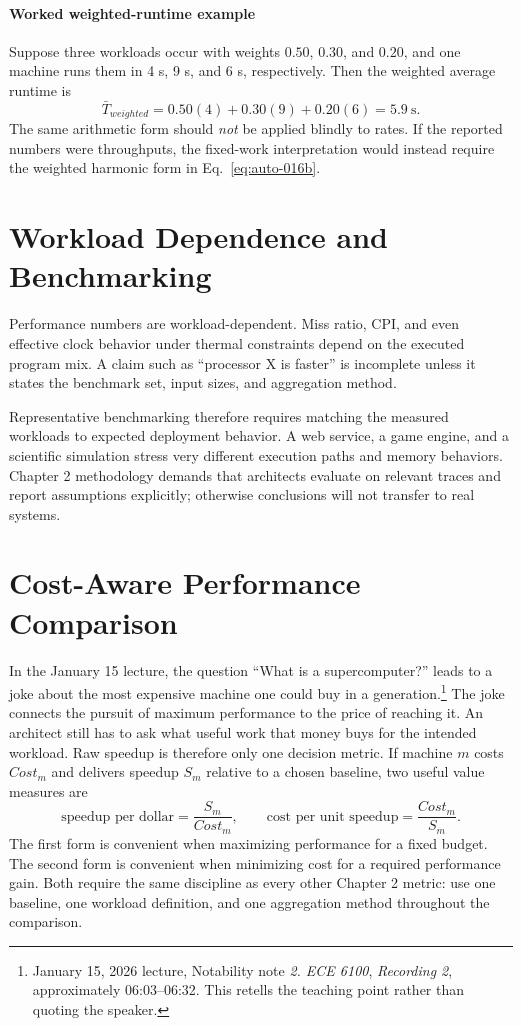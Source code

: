 \paragraph{Worked weighted-runtime example}\label{par:auto-011b}
Suppose three workloads occur with weights $0.50$, $0.30$, and $0.20$, and one machine runs them in 4 s, 9 s, and 6 s, respectively.
Then the weighted average runtime is
\begin{equation}\label{eq:auto-016c}
    \bar{T}_{weighted}=0.50(4)+0.30(9)+0.20(6)=5.9\ \text{s}.
\end{equation}
The same arithmetic form should \emph{not} be applied blindly to rates.
If the reported numbers were throughputs, the fixed-work interpretation would instead require the weighted harmonic form in Eq.~\eqref{eq:auto-016b}.


\section{Workload Dependence and Benchmarking}\label{sec:auto-017}
Performance numbers are workload-dependent.
Miss ratio, CPI, and even effective clock behavior under thermal constraints depend on the executed program mix.
A claim such as ``processor X is faster'' is incomplete unless it states the benchmark set, input sizes, and aggregation method.

Representative benchmarking therefore requires matching the measured workloads to expected deployment behavior.
A web service, a game engine, and a scientific simulation stress very different execution paths and memory behaviors.
Chapter 2 methodology demands that architects evaluate on relevant traces and report assumptions explicitly; otherwise conclusions will not transfer to real systems.


\section{Cost-Aware Performance Comparison}\label{sec:auto-017a}
In the January 15 lecture, the question ``What is a supercomputer?'' leads to a joke about the most expensive machine one could buy in a generation.\footnote{January 15, 2026 lecture, Notability note \emph{2. ECE 6100}, \emph{Recording 2}, approximately 06:03--06:32. This retells the teaching point rather than quoting the speaker.}
The joke connects the pursuit of maximum performance to the price of reaching it.
An architect still has to ask what useful work that money buys for the intended workload.
Raw speedup is therefore only one decision metric.
If machine $m$ costs $Cost_m$ and delivers speedup $S_m$ relative to a chosen baseline, two useful value measures are
\begin{equation}\label{eq:auto-017b}
    \text{speedup per dollar}=\frac{S_m}{Cost_m},
    \qquad
    \text{cost per unit speedup}=\frac{Cost_m}{S_m}.
\end{equation}
The first form is convenient when maximizing performance for a fixed budget.
The second form is convenient when minimizing cost for a required performance gain.
Both require the same discipline as every other Chapter 2 metric: use one baseline, one workload definition, and one aggregation method throughout the comparison.

